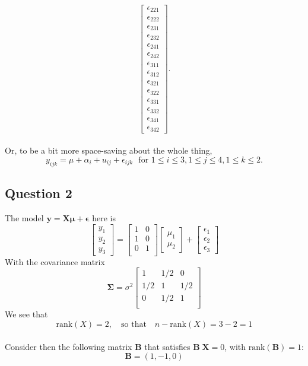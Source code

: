 \documentclass[paper=a4, fontsize=11pt]{scrartcl} %
\newcommand{\matSigma}{\mathbf{\Sigma}}
\newcommand{\vecEpsilon}{\mathbf{\epsilon}}
\newcommand{\vecMu}{\mathbf{\mu}}
\newcommand{\vecY}{\mathbf{y}}
\newcommand{\matB}{\mathbf{B}}
\newcommand{\matX}{\mathbf{X}}
\begin{document}
$$\begin{bmatrix}
\epsilon_{2 2 1} \\ \epsilon_{2 2 2} \\
\epsilon_{2 3 1} \\ \epsilon_{2 3 2} \\ 
\epsilon_{2 4 1} \\ \epsilon_{2 4 2} \\ 
\epsilon_{3 1 1} \\\epsilon_{3 1 2} \\ 
\epsilon_{3 2 1} \\ \epsilon_{3 2 2} \\
\epsilon_{3 3 1} \\ \epsilon_{3 3 2} \\ 
\epsilon_{3 4 1} \\ \epsilon_{3 4 2} 
\end{bmatrix}
.
$$\\

Or, to be a bit more space-saving about the whole thing, 
$$
y_{ijk} = \mu + \alpha_i + u_{ij} +\epsilon_{ijk} \ \ \ \text{for } 1 \leq i \leq 3, 1 \leq j \leq 4, 1 \leq k \leq 2.
$$ 


\bigskip
\bigskip
\subsection*{Question 2}
The model $\vecY = \matX \vecMu + \vecEpsilon$ here is 
$$
\begin{bmatrix} 
y_{1 } \\
y_{2} \\
y_{3} 
\end{bmatrix}
= 
\begin{bmatrix} 1 & 0\\
			     1 & 0\\
		 	     0 & 1\\
\end{bmatrix}
\begin{bmatrix} 
\mu_{1 } \\
\mu_{2} 
\end{bmatrix}
+
\begin{bmatrix} 
\epsilon_{1 } \\
\epsilon_{2} \\
\epsilon_{3} 
\end{bmatrix}
$$
With the covariance matrix
$$
\matSigma 
= \sigma^2 
\begin{bmatrix} 1 & 1/2 & 0\\
			     1/2 & 1 & 1/2\\
		 	     0 & 1/2 & 1\\
\end{bmatrix}
$$
We see that 
$$
\text{rank}(X) = 2, \ \ \ \text{ so that } \ \ \ n - \text{rank}(X) = 3 - 2 = 1
$$\\
Consider then the following matrix $\matB$ that satisfies $\matB \; \matX = 0$, with $\text{rank}(\matB) = 1$:
$$
\matB = (1, -1, 0)
$$
\end{document}
